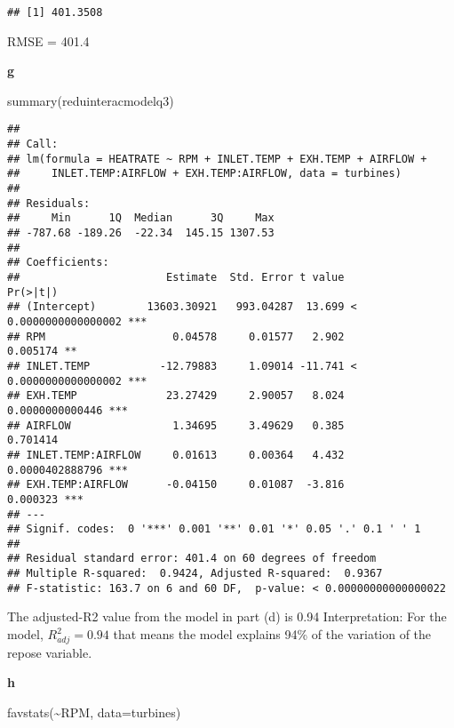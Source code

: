 \documentclass[
]{article}
\newenvironment{Shaded}{\begin{snugshade}}{\end{snugshade}}
\newcommand{\AttributeTok}[1]{\textcolor[rgb]{0.77,0.63,0.00}{#1}}
\newcommand{\FunctionTok}[1]{\textcolor[rgb]{0.00,0.00,0.00}{#1}}
\newcommand{\NormalTok}[1]{#1}
\newcommand{\SpecialCharTok}[1]{\textcolor[rgb]{0.00,0.00,0.00}{#1}}
\begin{document}
\begin{verbatim}
## [1] 401.3508
\end{verbatim}

RMSE = 401.4

\textbf{g}

\begin{Shaded}
\begin{Highlighting}[]
\FunctionTok{summary}\NormalTok{(reduinteracmodelq3)}
\end{Highlighting}
\end{Shaded}

\begin{verbatim}
## 
## Call:
## lm(formula = HEATRATE ~ RPM + INLET.TEMP + EXH.TEMP + AIRFLOW + 
##     INLET.TEMP:AIRFLOW + EXH.TEMP:AIRFLOW, data = turbines)
## 
## Residuals:
##     Min      1Q  Median      3Q     Max 
## -787.68 -189.26  -22.34  145.15 1307.53 
## 
## Coefficients:
##                       Estimate  Std. Error t value             Pr(>|t|)    
## (Intercept)        13603.30921   993.04287  13.699 < 0.0000000000000002 ***
## RPM                    0.04578     0.01577   2.902             0.005174 ** 
## INLET.TEMP           -12.79883     1.09014 -11.741 < 0.0000000000000002 ***
## EXH.TEMP              23.27429     2.90057   8.024      0.0000000000446 ***
## AIRFLOW                1.34695     3.49629   0.385             0.701414    
## INLET.TEMP:AIRFLOW     0.01613     0.00364   4.432      0.0000402888796 ***
## EXH.TEMP:AIRFLOW      -0.04150     0.01087  -3.816             0.000323 ***
## ---
## Signif. codes:  0 '***' 0.001 '**' 0.01 '*' 0.05 '.' 0.1 ' ' 1
## 
## Residual standard error: 401.4 on 60 degrees of freedom
## Multiple R-squared:  0.9424, Adjusted R-squared:  0.9367 
## F-statistic: 163.7 on 6 and 60 DF,  p-value: < 0.00000000000000022
\end{verbatim}

The adjusted-R2 value from the model in part (d) is 0.94 Interpretation:
For the model, \(R^2_{adj} = 0.94\) that means the model explains 94\%
of the variation of the repose variable.

\textbf{h}

\begin{Shaded}
\begin{Highlighting}[]
\FunctionTok{favstats}\NormalTok{(}\SpecialCharTok{\textasciitilde{}}\NormalTok{RPM, }\AttributeTok{data=}\NormalTok{turbines)}
\end{Highlighting}
\end{Shaded}
\end{document}

